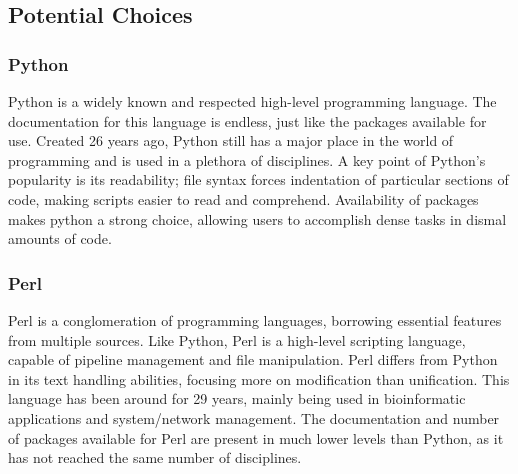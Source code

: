\documentclass[letterpaper, onecolumn, draftclsnofoot, 10pt, compsoc]{IEEEtran}
\begin{document}
        \subsection{Potential Choices}
        \subsubsection{Python}
                        \begin{singlespace}
                        Python is a widely known and respected high-level programming language.
                        The documentation for this language is endless, just like the packages available for use.
                        Created 26 years ago, Python still has a major place in the world of programming and is used in a plethora of disciplines\cite{python}.
                        A key point of Python's popularity is its readability; file syntax forces indentation of particular sections of code, making scripts easier to read and comprehend.
                        Availability of packages makes python a strong choice, allowing users to accomplish dense tasks in dismal amounts of code.
                        \end{singlespace}
                \subsubsection{Perl}
                        \begin{singlespace}
                        Perl is a conglomeration of programming languages, borrowing essential features from multiple sources.
                        Like Python, Perl is a high-level scripting language, capable of pipeline management and file manipulation.
                        Perl differs from Python in its text handling abilities, focusing more on modification than unification.
                        This language has been around for 29 years, mainly being used in bioinformatic applications and system/network management.
                        The documentation and number of packages available for Perl are present in much lower levels than Python, as it has not reached the same number of disciplines.
                        \end{singlespace}
\end{document}

